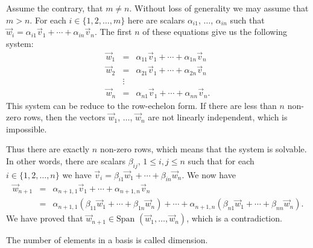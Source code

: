Assume the contrary, that \( m\neq n \). Without loss of generality we may assume that \( m> n \). For each \( i\in\{1,2,\dots, m\} \) here are scalars \( \alpha_{i1} \), \( \dots \), \( \alpha_{in} \) such that \( \overrightarrow w_i=\alpha_{i1}\overrightarrow v_1+\cdots+ \alpha_{in}\overrightarrow v_n \). The first \( n \) of these equations give us the following system: \begin{eqnarray*} \overrightarrow w_1&=&\alpha_{11}\overrightarrow v_1+\cdots+ \alpha_{1n}\overrightarrow v_n\\ \overrightarrow w_2&=&\alpha_{21}\overrightarrow v_1+\cdots+ \alpha_{2n}\overrightarrow v_n\\ &\vdots&\\ \overrightarrow w_n&=&\alpha_{n1}\overrightarrow v_1+\cdots+ \alpha_{nn}\overrightarrow v_n. \end{eqnarray*} This system can be reduce to the row-echelon form. If there are less than \( n \) non-zero rows, then the vectors \( \overrightarrow w_1 \), \( \dots \), \( \overrightarrow w_n \) are not linearly independent, which is impossible.

Thus there are exactly \( n \) non-zero rows, which means that the system is solvable. In other words, there are scalars \( \beta_{ij} \), \( 1\leq i,j\leq n \) such that for each \( i\in\{1,2,\dots, n\} \) we have \( \overrightarrow v_i=\beta_{i1}\overrightarrow w_1+\cdots+ \beta_{in}\overrightarrow w_n \). We now have \begin{eqnarray*} \overrightarrow w_{n+1}&=&\alpha_{n+1,1}\overrightarrow v_1+\cdots+\alpha_{n+1,n}\overrightarrow v_n\\ &=&\alpha_{n+1,1}\left(\beta_{11}\overrightarrow w_1+\cdots +\beta_{1n}\overrightarrow w_n\right) + \cdots + \alpha_{n+1,n}\left(\beta_{n1}\overrightarrow w_1+\cdots +\beta_{nn}\overrightarrow w_n\right). \end{eqnarray*} We have proved that \( \overrightarrow w_{n+1}\in\mbox{Span }(\overrightarrow w_1, \dots, \overrightarrow w_n) \), which is a contradiction.

The number of elements in a basis is called dimension.
